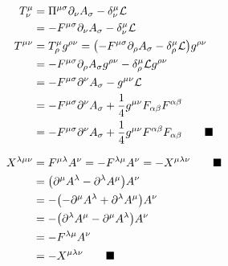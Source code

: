 \documentclass{article}
\begin{document}
\begin{align*}
  T^\mu_\nu  & =\Pi^{\mu\sigma}\partial_\nu A_\sigma-\delta^\mu_\nu\mathcal{L}                                              \\
             & =-F^{\mu\sigma}\partial_\nu A_\sigma-\delta^\mu_\nu\mathcal{L}                                               \\
  T^{\mu\nu} & =T^\mu_\rho g^{\rho\nu}=\pqty{-F^{\mu\sigma}\partial_\rho A_\sigma-\delta^\mu_\rho\mathcal{L}}g^{\rho\nu}    \\
             & =-F^{\mu\sigma}\partial_\rho A_\sigma g^{\rho\nu}-\delta^\mu_\rho\mathcal{L}g^{\rho\nu}                      \\
             & =-F^{\mu\sigma}\partial^\nu A_\sigma -g^{\mu\nu} \mathcal{L}                                                 \\
             & =-F^{\mu\sigma}\partial^\nu A_\sigma +\frac{1}{4}g^{\mu\nu} F_{\alpha\beta}F^{\alpha\beta}                   \\
             & =-F^{\mu\sigma}\partial^\nu A_\sigma +\frac{1}{4}g^{\mu\nu} F^{\alpha\beta}F_{\alpha\beta}\qquad\blacksquare \\
\end{align*}

\begin{align*}
  X^{\lambda\mu\nu} & =F^{\mu\lambda}A^\nu =-F^{\lambda\mu}A^\nu=-X^{\mu\lambda\nu}\qquad\blacksquare \\
                    & =\pqty{\partial^\mu A^\lambda-\partial^\lambda A^\mu}A^\nu                      \\
                    & =-\pqty{-\partial^\mu A^\lambda+\partial^\lambda A^\mu}A^\nu                    \\
                    & =-\pqty{\partial^\lambda A^\mu-\partial^\mu A^\lambda}A^\nu                     \\
                    & =-F^{\lambda\mu}A^\nu                                                           \\
                    & =-X^{\mu\lambda\nu}\qquad\blacksquare
\end{align*}
\end{document}
